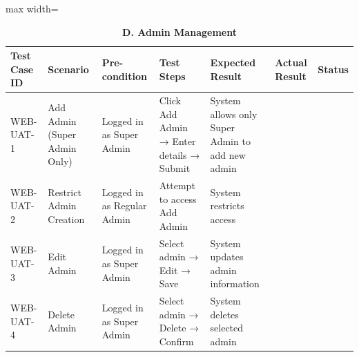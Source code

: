 {	
	\begin{table}[H]
		\centering
		\renewcommand{\arraystretch}{1.2}
		\caption*{\textbf{D. Admin Management}}
		
		\begin{adjustbox}{max width=\textwidth}
			\begin{tabular}{p{2cm}p{3cm}p{3cm}p{3cm}p{4cm}p{4cm}p{1.5cm}}
				\toprule
				\textbf{Test Case ID} & \textbf{Scenario} & \textbf{Pre-condition} & \textbf{Test Steps} & \textbf{Expected Result} & \textbf{Actual Result} & \textbf{Status} \\
				\midrule
				WEB-UAT-1 & Add Admin (Super Admin Only) & Logged in as Super Admin & Click Add Admin → Enter details → Submit & System allows only Super Admin to add new admin & & \\
				WEB-UAT-2 & Restrict Admin Creation & Logged in as Regular Admin & Attempt to access Add Admin & System restricts access & & \\
				WEB-UAT-3 & Edit Admin & Logged in as Super Admin & Select admin → Edit → Save & System updates admin information & & \\
				WEB-UAT-4 & Delete Admin & Logged in as Super Admin & Select admin → Delete → Confirm & System deletes selected admin & & \\
				\bottomrule
			\end{tabular}
		\end{adjustbox}
	\end{table}
	
	
	\begin{table}[H]
		\centering
		\renewcommand{\arraystretch}{1.2}
		\caption*{\textbf{E. GIS Mapping}}
		

\end{table}}
